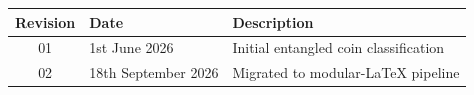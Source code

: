 \begin{table}[H]
\centering
\begin{tabular}{cll}
\toprule
\textbf{Revision} & \textbf{Date} & \textbf{Description} \\
\midrule
01 & 1st June 2026       & Initial entangled coin classification \\
02 & 18th September 2026 & Migrated to modular-LaTeX pipeline \\
\bottomrule
\end{tabular}
\end{table}
